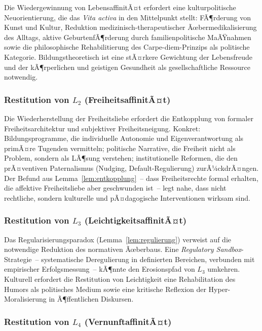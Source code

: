 ﻿\documentclass[a4paper,12pt]{article}
\theoremstyle{definition}
\begin{document}
Die Wiedergewinnung von LebensaffinitÃ¤t erfordert eine kulturpolitische Neuorientierung, die das \emph{Vita activa} in den Mittelpunkt stellt: FÃ¶rderung von Kunst und Kultur, Reduktion medizinisch-therapeutischer Ãœbermedikalisierung des Alltags, aktive GeburtenfÃ¶rderung durch familienpolitische MaÃŸnahmen sowie die philosophische Rehabilitierung des Carpe-diem-Prinzips als politische Kategorie. Bildungstheoretisch ist eine stÃ¤rkere Gewichtung der Lebensfreude und der kÃ¶rperlichen und geistigen Gesundheit als gesellschaftliche Ressource notwendig.

\subsubsection{Restitution von $L_2$ (FreiheitsaffinitÃ¤t)}

Die Wiederherstellung der Freiheitsliebe erfordert die Entkopplung von formaler Freiheitsarchitektur und subjektiver Freiheitsneigung. Konkret: Bildungsprogramme, die individuelle Autonomie und Eigenverantwortung als primÃ¤re Tugenden vermitteln; politische Narrative, die Freiheit nicht als Problem, sondern als LÃ¶sung verstehen; institutionelle Reformen, die den prÃ¤ventiven Paternalismus (Nudging, Default-Regulierung) zurÃ¼ckdrÃ¤ngen. Der Befund aus Lemma~\ref{lem:entkopplung}~-- dass Freiheitsrechte formal erhalten, die affektive Freiheitsliebe aber geschwunden ist~-- legt nahe, dass nicht rechtliche, sondern kulturelle und pÃ¤dagogische Interventionen wirksam sind.

\subsubsection{Restitution von $L_3$ (LeichtigkeitsaffinitÃ¤t)}

Das Regularisierungsparadox (Lemma~\ref{lem:regulierung}) verweist auf die notwendige Reduktion des normativen Ãœberbaus. Eine \emph{Regulatory Sandbox}-Strategie~-- systematische Deregulierung in definierten Bereichen, verbunden mit empirischer Erfolgsmessung~-- kÃ¶nnte den Erosionspfad von $L_3$ umkehren. Kulturell erfordert die Restitution von Leichtigkeit eine Rehabilitation des Humors als politisches Medium sowie eine kritische Reflexion der Hyper-Moralisierung in Ã¶ffentlichen Diskursen.

\subsubsection{Restitution von $L_4$ (VernunftaffinitÃ¤t)}
\end{document}
